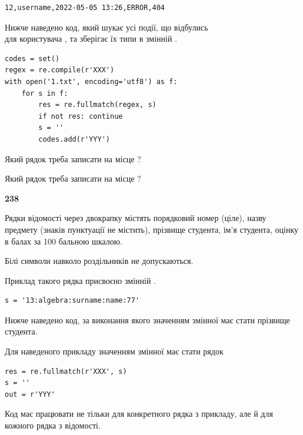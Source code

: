 \begin{verbatim}
12,username,2022-05-05 13:26,ERROR,404
\end{verbatim}


Нижче наведено код, який шукає усі події, що відбулись\\ для користувача , та зберігає їх типи в змінній .



\begin{verbatim}
codes = set()
regex = re.compile(r'XXX')
with open('1.txt', encoding='utf8') as f:
    for s in f:
        res = re.fullmatch(regex, s)
        if not res: continue
        s = ''
        codes.add(r'YYY')
\end{verbatim}





Який рядок треба записати на місце  ?\par
\vspace{5mm}


Який рядок треба записати на місце  ?\par


\newpage

{\begin {center}\textbf{ 238}\end {center}}\par
Рядки відомості через двокрапку містять порядковий номер (ціле), назву предмету (знаків пунктуації не містить), прізвище студента, ім'я студента, оцінку в балах за 100 бальною шкалою.

Білі символи навколо роздільників не допускаються.

Приклад такого рядка присвоєно змінній .



\begin{verbatim}
s = '13:algebra:surname:name:77'
\end{verbatim}


Нижче наведено код, за виконання якого значенням змінної  має стати прізвище студента.

Для наведеного прикладу значенням змінної  має стати рядок 



\begin{verbatim}
res = re.fullmatch(r'XXX', s)
s = ''
out = r'YYY'
\end{verbatim}


Код має працювати не тільки для конкретного рядка з прикладу, але й для кожного рядка з відомості.




